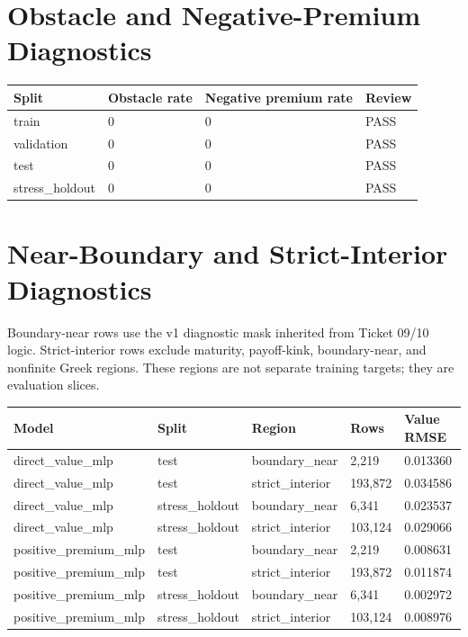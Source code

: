 \documentclass[11pt,a4paper]{article}
\begin{document}
\section{Obstacle and Negative-Premium Diagnostics}

\begin{longtable}{L{0.18\textwidth} L{0.20\textwidth} L{0.20\textwidth} L{0.20\textwidth}}
\toprule
Split & Obstacle rate & Negative premium rate & Review \\
\midrule
\endhead
train & 0 & 0 & PASS \\
validation & 0 & 0 & PASS \\
test & 0 & 0 & PASS \\
stress\_holdout & 0 & 0 & PASS \\
\bottomrule
\end{longtable}

\section{Near-Boundary and Strict-Interior Diagnostics}

Boundary-near rows use the v1 diagnostic mask inherited from Ticket 09/10 logic. Strict-interior rows
exclude maturity, payoff-kink, boundary-near, and nonfinite Greek regions. These regions are not
separate training targets; they are evaluation slices.

\begin{longtable}{L{0.22\textwidth} L{0.16\textwidth} L{0.18\textwidth} L{0.15\textwidth} L{0.16\textwidth}}
\toprule
Model & Split & Region & Rows & Value RMSE \\
\midrule
\endhead
direct\_value\_mlp & test & boundary\_near & 2,219 & 0.013360 \\
direct\_value\_mlp & test & strict\_interior & 193,872 & 0.034586 \\
direct\_value\_mlp & stress\_holdout & boundary\_near & 6,341 & 0.023537 \\
direct\_value\_mlp & stress\_holdout & strict\_interior & 103,124 & 0.029066 \\
positive\_premium\_mlp & test & boundary\_near & 2,219 & 0.008631 \\
positive\_premium\_mlp & test & strict\_interior & 193,872 & 0.011874 \\
positive\_premium\_mlp & stress\_holdout & boundary\_near & 6,341 & 0.002972 \\
positive\_premium\_mlp & stress\_holdout & strict\_interior & 103,124 & 0.008976 \\
\bottomrule
\end{longtable}
\end{document}
